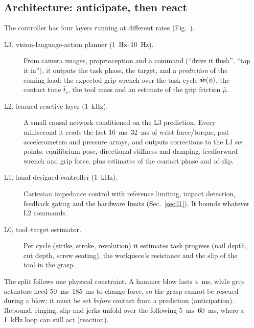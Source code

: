\subsection{Architecture: anticipate, then react}
The controller has four layers running at different rates (Fig.~).
\begin{description}
  \item[L3, vision-language-action planner (\SIrange{1}{10}{\hertz}).] From camera images, proprioception and a
    command (``drive it flush'', ``tap it in''), it outputs the task phase, the target, and a \emph{prediction} of
    the coming load: the expected grip wrench over the task cycle $\hat{\boldsymbol{w}}(\phi)$, the contact time
    $\hat t_c$, the tool mass and an estimate of the grip friction $\hat\mu$.
  \item[L2, learned reactive layer (\SI{1}{\kilo\hertz}).] A small causal network conditioned on the L3 prediction.
    Every millisecond it reads the last \SIrange{16}{32}{\milli\second} of wrist force/torque, pad accelerometers
    and pressure arrays, and outputs corrections to the L1 set points: equilibrium pose, directional stiffness and
    damping, feedforward wrench and grip force, plus estimates of the contact phase and of slip.
  \item[L1, hand-designed controller (\SI{1}{\kilo\hertz}).] Cartesian impedance control with reference
    limiting, impact detection, feedback gating and the hardware limits (Sec.~\ref{sec:l1}). It bounds whatever
    L2 commands.
  \item[L0, tool--target estimator.] Per cycle (strike, stroke, revolution) it estimates task progress (nail depth,
    cut depth, screw seating), the workpiece's resistance and the slip of the tool in the grasp.
\end{description}
The split follows one physical constraint. A hammer blow lasts \SI{4}{\milli\second}, while grip actuators need
\SIrange{50}{185}{\milli\second} to change force, so the grasp cannot be rescued during a blow: it must be set
\emph{before} contact from a prediction (anticipation). Rebound, ringing, slip and jerks unfold over the following
\SIrange{5}{60}{\milli\second}, where a \SI{1}{\kilo\hertz} loop can still act (reaction).

